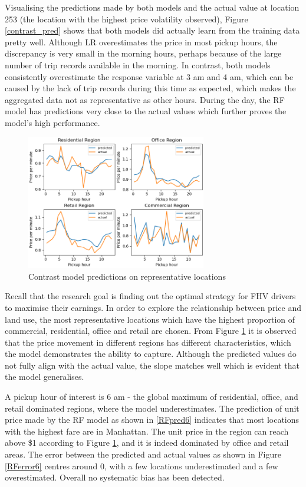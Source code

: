 \documentclass[11pt]{article}
\begin{document}
 Visualising the predictions made by both models and the actual value at location 253 (the location with the highest price volatility observed), Figure \ref{contrast_pred} shows that both models did actually learn from the training data pretty well. Although LR overestimates the price in most pickup hours, the discrepancy is very small in the morning hours, perhaps because of the large number of trip records available in the morning. In contrast, both models consistently overestimate the response variable at 3 am and 4 am, which can be caused by the lack of trip records during this time as expected, which makes the aggregated data not as representative as other hours. During the day, the RF model has predictions very close to the actual values which further proves the model's high performance.

\begin{figure}[h]
    \includegraphics[width=0.7\textwidth]{plots/contrast_by_loc.png}
    \centering
    \caption{Contrast model predictions on representative locations}
    \label{contrast_loc}
\end{figure}

Recall that the research goal is finding out the optimal strategy for FHV drivers to maximise their earnings. In order to explore the relationship between price and land use, the most representative  locations which have the highest proportion of commercial, residential, office and retail are chosen. From Figure \ref{contrast_loc} it is observed that the price movement in different regions has different characteristics, which the model demonstrates the ability to capture. Although the predicted values do not fully align with the actual value, the slope matches well which is evident that the model generalises. 

A pickup hour of interest is 6 am - the global maximum of residential, office, and retail dominated regions, where the model underestimates. The prediction of unit price made by the RF model as shown in \ref{RFpred6} indicates that most locations with the highest fare are in Manhattan. The unit price in the region can reach above \$1 according to Figure \ref{contrast_loc}, and it is indeed dominated by office and retail areas. The error between the predicted and actual values as shown in Figure \ref{RFerror6} centres around 0, with a few locations underestimated and a few overestimated. Overall no systematic bias has been detected. 
\end{document}
